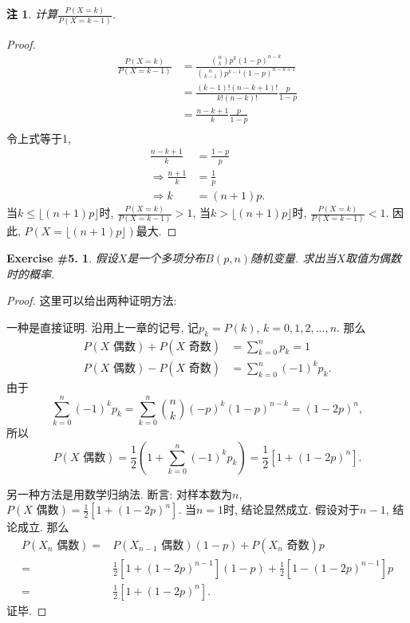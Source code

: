 \documentclass[UTF8, a4paper]{article}
\newtheorem{exercise}{Exercise \#5.}
\newtheorem*{remark}{注}
\begin{document}
\begin{remark}
计算\(\frac{P(X = k)}{P(X = k-1)}\).
\end{remark}

\begin{proof}
$$
\begin{aligned}
    \frac{P(X = k)}{P(X = k-1)} &= \frac{\binom{n}{k}p^k(1-p)^{n-k}}{\binom{n}{k-1}p^{k-1}(1-p)^{n-k+1}} \\
    &= \frac{(k-1)!(n-k+1)!}{k!(n-k)!}\frac{p}{1-p} \\
    &= \frac{n-k+1}{k}\frac{p}{1-p} \\
\end{aligned}
$$
令上式等于1, 
$$
\begin{aligned}
    \frac{n-k+1}{k} &= \frac{1-p}{p} \\
    \Rightarrow \frac{n+1}{k} &= \frac{1}{p} \\
    \Rightarrow k &= (n + 1)p.
\end{aligned}
$$
当\(k\leq \lfloor (n+1)p \rfloor\)时, \(\frac{P(X = k)}{P(X = k-1)} > 1\), 当\(k > \lfloor (n+1)p \rfloor\)时, \(\frac{P(X = k)}{P(X = k-1)} < 1\). 因此, \(P(X = \lfloor (n+1)p \rfloor)\)最大.

\end{proof}


\begin{framed}
\begin{exercise}
    假设\(X\)是一个多项分布\(B(p,n)\)随机变量.
    求出当\(X\)取值为偶数时的概率.
\end{exercise}
\end{framed}

\begin{proof}
这里可以给出两种证明方法: 

一种是直接证明. 沿用上一章的记号, 记\(p_k = P({k})\), \(k = 0,1,2,...,n\).
那么
$$
\begin{aligned}
    P(X \text{ 偶数}) + P(X \text{ 奇数}) &= \sum_{k=0}^{n} p_k  = 1\\
    P(X \text{ 偶数}) - P(X \text{ 奇数}) &= \sum_{k=0}^{n} (-1)^k p_k .
\end{aligned}
$$
由于
$$
\sum_{k=0}^{n} (-1)^k p_k = \sum_{k=0}^{n}\binom{n}{k}(-p)^k (1-p)^{n-k} = (1 - 2p)^n,
$$
所以
$$
P(X \text{ 偶数}) = \frac{1}{2}\left(1+\sum_{k=0}^{n} (-1)^k p_k\right) = \frac{1}{2} \left[1 + (1-2p)^n\right].
$$


另一种方法是用数学归纳法. 断言: 对样本数为\(n\), \(P(X \text{ 偶数}) = \frac{1}{2} \left[1 + (1-2p)^n\right]\). 当\(n = 1\)时, 结论显然成立. 假设对于\(n-1\), 结论成立. 那么
$$
\begin{aligned}
    P(X_n \text{ 偶数}) = &P(X_{n-1} \text{ 偶数})(1 - p) + P(X_n \text{ 奇数} )p \\
    =& \frac{1}{2} \left[1 + (1-2p)^{n-1}\right](1-p) + \frac{1}{2} \left[1 - (1-2p)^{n-1}\right]p \\
    =& \frac{1}{2} \left[1 + (1-2p)^n\right].
\end{aligned}
$$
证毕.
\end{proof}
\end{document}
